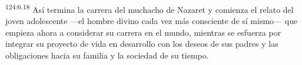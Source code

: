 \par 
\textsuperscript{124:6.18} Así termina la carrera del muchacho de Nazaret y comienza el relato del joven adolescente ---el hombre divino cada vez más consciente de sí mismo--- que empieza ahora a considerar su carrera en el mundo, mientras se esfuerza por integrar su proyecto de vida en desarrollo con los deseos de sus padres y las obligaciones hacia su familia y la sociedad de su tiempo.
